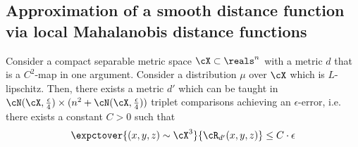 \subsection{Approximation of a smooth distance function via local Mahalanobis distance functions}
\begin{theorem} Consider a compact separable metric space $\cX \subset \reals^n$ with a metric $d$ that is a $C^2$-map in one argument. Consider a distribution $\mu$ over $\cX$ which is $L$-lipschitz. %
Then, there exists a metric $d'$ which can be taught in $\cN(\cX, \frac{\epsilon}{4})\times (n^2 + \cN(\cX, \frac{\epsilon}{4}))$ triplet comparisons achieving an $\epsilon$-error, i.e. there exists a constant $C > 0$ such that
\begin{align*}
    \expctover{(x,y,z) \sim \cX^3}{\cR_{d'}(x,y,z)} \le C\cdot\epsilon
\end{align*}
    
\end{theorem}

